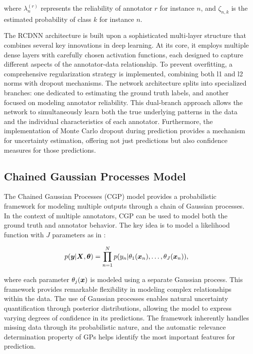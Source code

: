 where $\lambda_n^{(r)}$ represents the reliability of annotator $r$
for instance $n$, and $\zeta_{n,k}$ is the estimated probability of
class $k$ for instance $n$.

The RCDNN architecture is built upon a sophisticated multi-layer
structure that combines several key innovations in deep learning. At
its core, it employs multiple dense layers with carefully chosen
activation functions, each designed to capture different aspects of
the annotator-data relationship. To prevent overfitting, a
comprehensive regularization strategy is implemented, combining both
l1 and l2 norms with dropout mechanisms. The network architecture
splits into specialized branches: one dedicated to estimating the
ground truth labels, and another focused on modeling annotator
reliability. This dual-branch approach allows the network to
simultaneously learn both the true underlying patterns in the data
and the individual characteristics of each annotator. Furthermore,
the implementation of Monte Carlo dropout during prediction provides
a mechanism for uncertainty estimation, offering not just predictions
but also confidence measures for those predictions.

\subsection{Chained Gaussian Processes Model}

The Chained Gaussian Processes (CGP) model provides a probabilistic
framework for modeling multiple outputs through a chain of Gaussian
processes. In the context of multiple annotators, CGP can be used to
model both the ground truth and annotator behavior. The key idea is
to model a likelihood function with $J$ parameters as in
\cite{GiraldoEtAl2022}:

\begin{align}
  p({\bm{y}}|{\bm{X}},\bm{\theta}) =
  \prod_{n=1}^{N}p(y_n|\theta_1({\bm{x}}_n),\dots , \theta_J({\bm{x}}_n)),
\end{align}

where each parameter $\theta_j({\bm{x}})$ is modeled using a separate
Gaussian process. This framework provides remarkable flexibility in
modeling complex relationships within the data. The use of Gaussian
processes enables natural uncertainty quantification through
posterior distributions, allowing the model to express varying
degrees of confidence in its predictions. The framework inherently
handles missing data through its probabilistic nature, and the
automatic relevance determination property of GPs helps identify the
most important features for prediction.

